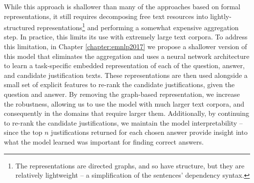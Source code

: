 While this approach is shallower than many of the approaches based on formal representations, it still requires decomposing free text resources into lightly-structured representations\footnote{The representations are directed graphs, and so have structure, but they are relatively lightweight -- a simplification of the sentences' dependency syntax.} and performing a somewhat expensive aggregation step.  In practice, this limits its use with extremely large text corpora.  
To address this limitation, in Chapter \ref{chapter:emnlp2017} we propose a shallower version of this model that eliminates the aggregation and uses a neural network architecture to learn a task-specific embedded representation of each of the question, answer, and candidate justification texts.  These representations are then used alongside a small set of explicit features to re-rank the candidate justifications, given the question and answer.  By removing the graph-based representation, we increase the robustness, allowing us to use the model with much larger text corpora, and consequently in the domains that require larger them.   Additionally, by continuing to re-rank the candidate justifications, we maintain the model interpretability -- since the top $n$ justifications returned for each chosen answer provide insight into what the model learned was important for finding correct answers.

